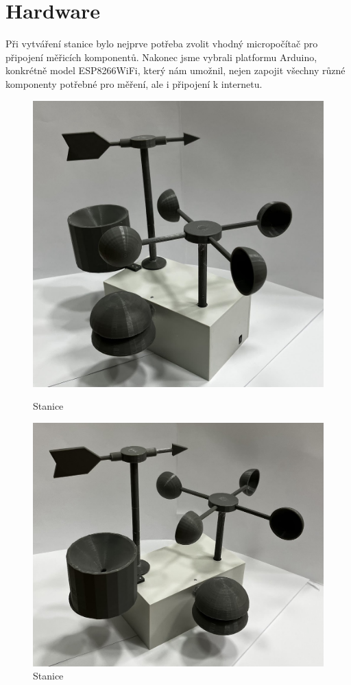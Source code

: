 \section{Hardware}
Při vytváření stanice bylo nejprve potřeba zvolit vhodný micropočítač pro připojení měřicích komponentů. Nakonec jsme vybrali platformu Arduino,
konkrétně model ESP8266WiFi, který nám umožnil, nejen zapojit všechny různé komponenty potřebné pro měření, ale i připojení k internetu.

\begin{figure}[!htb]
   \begin{minipage}{0.48\textwidth}
     \centering
     \includegraphics[width=.7\linewidth]{images/stanice0.jpg}
     \caption{Stanice}
   \end{minipage}\hfill
   \begin{minipage}{0.5\textwidth}
     \centering
     \includegraphics[width=.7\linewidth]{images/stanice1.jpg}
     \caption{Stanice}
   \end{minipage}
\end{figure}
